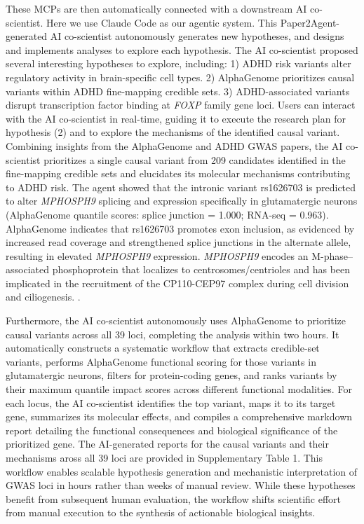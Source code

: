 \documentclass[11pt]{article}
\begin{document}
 These MCPs are then automatically connected with a downstream AI co-scientist. Here we use Claude Code as our agentic system. This Paper2Agent-generated AI co-scientist autonomously generates new hypotheses, and designs and implements analyses to explore each hypothesis. The AI co-scientist proposed several interesting hypotheses to explore, including: 1) ADHD risk variants alter regulatory activity in brain-specific cell types. 2) AlphaGenome prioritizes causal variants within ADHD fine-mapping credible sets. 3) ADHD-associated variants disrupt transcription factor binding at \textit{FOXP} family gene loci. Users can interact with the AI co-scientist in real-time, guiding it to execute the research plan for hypothesis (2) and to explore the mechanisms of the identified causal variant. Combining insights from the AlphaGenome and ADHD GWAS papers, the AI co-scientist prioritizes a single causal variant from 209 candidates identified in the fine-mapping credible sets and elucidates its molecular mechanisms contributing to ADHD risk. The agent showed that the intronic variant rs1626703 is predicted to alter \textit{MPHOSPH9} splicing and expression specifically in glutamatergic neurons (AlphaGenome quantile scores: splice junction = 1.000; RNA-seq = 0.963). AlphaGenome  indicates that rs1626703 promotes exon inclusion, as evidenced by increased read coverage and strengthened splice junctions in the alternate allele, resulting in elevated \textit{MPHOSPH9} expression. \textit{MPHOSPH9} encodes an M-phase–associated phosphoprotein that localizes to centrosomes/centrioles and has been implicated in the recruitment of the CP110-CEP97 complex during cell division and ciliogenesis. \citep{huang2018m}.

Furthermore, the AI co-scientist autonomously uses AlphaGenome to prioritize causal variants across all 39 loci, completing the analysis within two hours. It automatically constructs a systematic workflow that extracts credible-set variants, performs AlphaGenome functional scoring for those variants in glutamatergic neurons, filters for protein-coding genes, and ranks variants by their maximum quantile impact scores across different functional modalities. For each locus, the AI co-scientist identifies the top variant, maps it to its target gene, summarizes its molecular effects, and compiles a comprehensive markdown report detailing the functional consequences and biological significance of the prioritized gene. The AI-generated reports for the causal variants and their mechanisms aross all 39 loci are provided in Supplementary Table 1. This workflow enables scalable hypothesis generation and mechanistic interpretation of GWAS loci in hours rather than weeks of manual review. While these hypotheses benefit from subsequent human evaluation, the workflow shifts scientific effort from manual execution to the synthesis of actionable biological insights.
\end{document}
